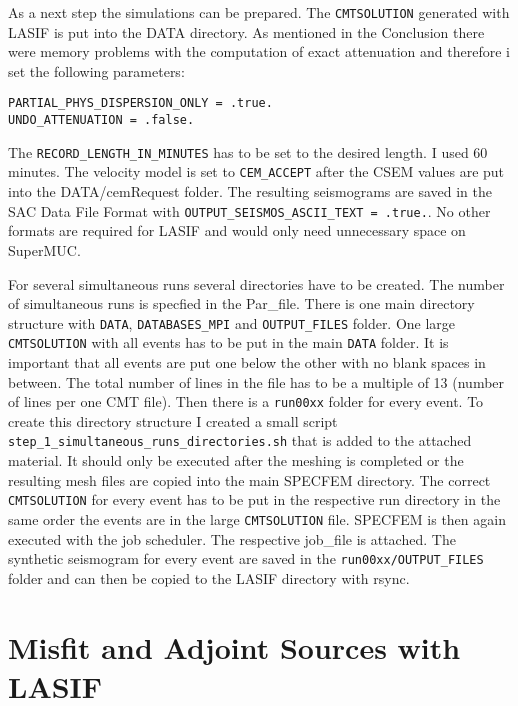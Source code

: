As a next step the simulations can be prepared. 
The \texttt{CMTSOLUTION} generated with LASIF is put into the DATA directory.
As mentioned in the Conclusion there were memory problems with the 
computation of exact attenuation and therefore i set the following parameters:
\begin{lstlisting} 
PARTIAL_PHYS_DISPERSION_ONLY = .true.
UNDO_ATTENUATION = .false.
\end{lstlisting}

The \texttt{RECORD\_LENGTH\_IN\_MINUTES} has to be set to the desired length. 
I used 60 minutes. 
The velocity model is set to \texttt{CEM\_ACCEPT} after the CSEM values are 
put into the DATA/cemRequest folder.
The resulting seismograms are saved in the SAC Data File Format
with \texttt{OUTPUT\_SEISMOS\_ASCII\_TEXT = .true.}. 
No other formats are required for LASIF and would only need unnecessary 
space on SuperMUC.

For several simultaneous runs several directories have to be created.
The number of simultaneous runs is specfied in the Par\_file.
There is one main directory structure with \texttt{DATA}, \texttt{DATABASES\_MPI}
and \texttt{OUTPUT\_FILES} folder.
One large \texttt{CMTSOLUTION} with all events has to be put in the main 
\texttt{DATA} folder. 
It is important that all events are put one below the other with no 
blank spaces in between. 
The total number of lines in the file has to be a multiple of 13 
(number of lines per one CMT file).
Then there is a \texttt{run00xx} folder for every event.
To create this directory structure I created a small script \texttt{step\_1\_simultaneous\_runs\_directories.sh} that is added to 
the attached material. 
It should only be executed after the meshing is completed or the 
resulting mesh files are copied into the main SPECFEM directory.
The correct \texttt{CMTSOLUTION} for every event has to be put in the 
respective run directory in the same order the events are in the large
\texttt{CMTSOLUTION} file.
SPECFEM is then again executed with the job scheduler. 
The respective job\_file is attached.
The synthetic seismogram for every event are saved in the 
\texttt{run00xx/OUTPUT\_FILES} folder and can then be copied to the 
LASIF directory with rsync.



\section{Misfit and Adjoint Sources with LASIF}

